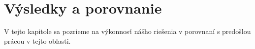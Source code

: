 \chapter{Výsledky a porovnanie}

V tejto kapitole sa pozrieme na výkonnosť nášho riešenia v porovnaní
s predošlou prácou v tejto oblasti.
